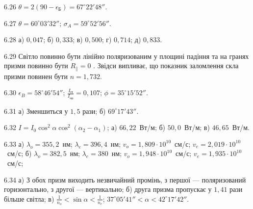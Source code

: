 \begin{Solution}{6.{26}}
        $ \theta = 2(90 - \epsilon_\text{Б}) = 67^\circ22'48'' $.
    
\end{Solution}
\begin{Solution}{6.{27}}
        $ \theta = 60^\circ03'32'' $; $ \sigma_A = 59^\circ52'56'' $.
    
\end{Solution}
\begin{Solution}{6.{28}}
         а) $0,047$; б) $0,333$; в) $0,500$; г) $0,714$; д) $0,833 $.
    
\end{Solution}
\begin{Solution}{6.{29}}
        Світло повинно бути лінійно поляризованим у площині падіння та на гранях призми повинно бути $ R_{\parallel} = 0 $ . Звідси випливає, що показник заломлення скла призми повинен бути $ n = 1,732 $.
    
\end{Solution}
\begin{Solution}{6.{30}}
        $ \epsilon_B = 58^\circ46'54'' $; $ \frac{I_\text{П}}{I_\text{пр}} = 0,107 $; $ \phi = 35^\circ15'52'' $.
    
\end{Solution}
\begin{Solution}{6.{31}}
        а) Зменшиться у $ 1,5 $ рази; б) $ 69^\circ17'43'' $.
    
\end{Solution}
\begin{Solution}{6.{32}}
        $ I = I_0 \cos^2 \alpha \cos^2(\alpha_2 - \alpha_1) $; а) $ 66,22 $~Вт/м; б) $ 50,0 $~Вт/м; в) $ 46,65 $~Вт/м.
    
\end{Solution}
\begin{Solution}{6.{33}}
        а) $ \lambda_o = 355,2$~нм; $\lambda_e = 396,4 $~нм; $v_o = 1,809\cdot10^{10} $~см/с; $v_e = 2,019\cdot10^{10}$~см/с; б) $ \lambda_o = 382,5 $~нм; $\lambda_e = 380 $~нм; $v_o = 1,948\cdot10^{10} $~см/с; $v_e = 1,935\cdot10^{10}$~см/с;
    
\end{Solution}
\begin{Solution}{6.{34}}
        а) З обох призм виходить незвичайний промінь, з першої --- поляризований горизонтально, з другої --- вертикально; б) друга призма пропускає у $ 1,41 $ рази більше світла; в) $ \frac{1}{n_o} < \sin \alpha<\frac{1}{n_e} $; $ 37^\circ05'41''<\alpha<42^\circ17'42'' $.
    
\end{Solution}
